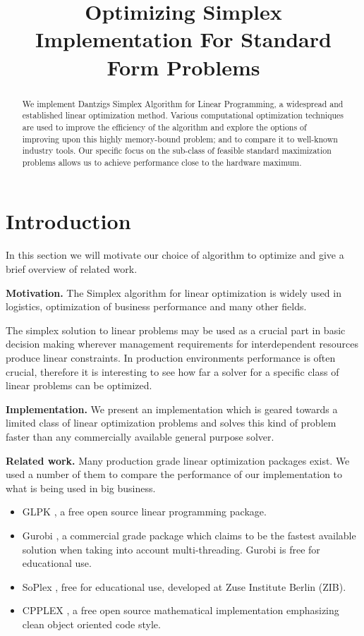 \documentclass[letterpaper]{article}
\title{Optimizing Simplex Implementation For Standard Form Problems}
\newcommand{\mypar}[1]{{\bf #1.}}
\begin{document}
%
\maketitle
%

\listoftodos

\begin{abstract}
We implement Dantzigs Simplex Algorithm for Linear Programming, a widespread and established linear optimization method.
Various computational optimization techniques are used to improve the efficiency of the algorithm and explore the options of improving upon this highly memory-bound problem;
and to compare it to well-known industry tools.
Our specific focus on the sub-class of feasible standard maximization problems allows us to achieve performance close to the hardware maximum.
\end{abstract}


\section{Introduction}\label{sec:intro}

In this section we will motivate our choice of algorithm to optimize and give
a brief overview of related work.

\mypar{Motivation} The Simplex algorithm for linear optimization is widely
used in logistics, optimization of business performance and many other fields.

The simplex solution to linear problems may be used as a crucial part in
basic decision making wherever management requirements for interdependent resources produce linear constraints.
In production environments performance is often crucial, therefore it is interesting to see how far
a solver for a specific class of linear problems can be optimized.

\mypar{Implementation} We present an implementation which is geared towards 
a limited class of linear optimization problems and solves this kind of problem
faster than any commercially available general purpose solver.

\mypar{Related work} Many production grade linear optimization packages exist.
We used a number of them to compare the performance of our implementation to what is being
used in big business.
\begin{itemize}
    \item{GLPK \cite{glpk}, a free open source linear programming package.}
    \item{Gurobi \cite{gurobi}, a commercial grade package which claims to be the fastest available solution when taking into account multi-threading. Gurobi is free for educational use.}
    \item{SoPlex \cite{soplex}, free for educational use, developed at Zuse Institute Berlin (ZIB).}
    \item{CPPLEX \cite{cpplex}, a free open source mathematical implementation emphasizing clean object oriented code style.}
\end{itemize}
\end{document}
